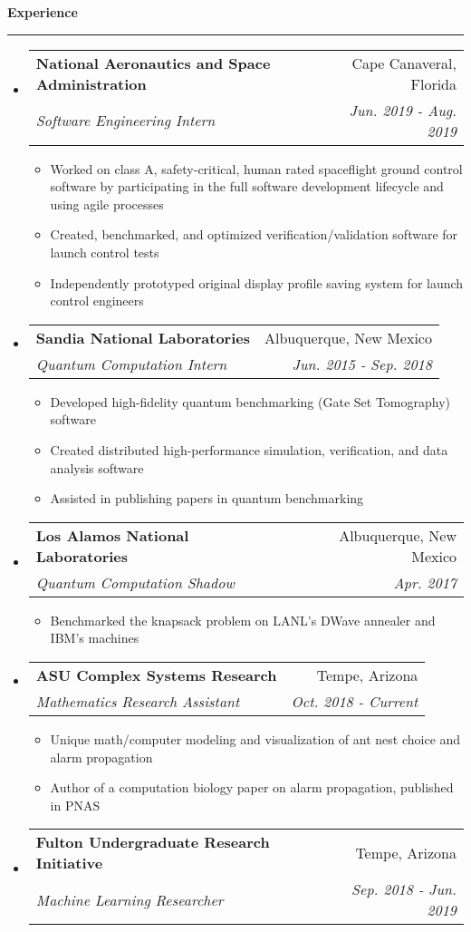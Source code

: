 \documentclass[letterpaper,11pt]{article}
\makeatletter
\newcommand{\sectionline}{
    \noindent\rule[0.5ex]{\linewidth}{0.5pt}
}
\newcommand{\resitem}[1]{\item #1 \vspace{-3pt}}
\newcommand{\resheading}[1]{
    {\large \textbf{#1}}
    \sectionline
}
\newcommand{\colfill}{@{\extracolsep{\fill}}}
\newcommand{\ressubheading}[4]{
\begin{tabular*}{6.5in}{l\colfill r}
		\textbf{#1} & #2 \\
		\textit{#3} & \textit{#4} \\
\end{tabular*}\vspace{-6pt}}
\makeatother
\begin{document}
\resheading{Experience}
\begin{itemize}
 \item
     \ressubheading{National Aeronautics and Space Administration}{Cape Canaveral, Florida}{Software Engineering Intern}{Jun. 2019 - Aug. 2019}
 	\begin{itemize}
 		\resitem{Worked on class A, safety-critical, human rated spaceflight ground control software by participating in the full software development lifecycle and using agile processes}
        \resitem{Created, benchmarked, and optimized verification/validation software for launch control tests}
 		\resitem{Independently prototyped original display profile saving system for launch control engineers}
 	\end{itemize}
 \item
    \ressubheading{Sandia National Laboratories}{Albuquerque, New Mexico}{Quantum Computation Intern}{Jun. 2015 - Sep. 2018}
 	\begin{itemize}
        \resitem{Developed high-fidelity quantum benchmarking (Gate Set Tomography) software}
 		\resitem{Created distributed high-performance simulation, verification, and data analysis software}
 		\resitem{Assisted in publishing papers in quantum benchmarking}
 	\end{itemize}
 \item
     \ressubheading{Los Alamos National Laboratories}{Albuquerque, New Mexico}{Quantum Computation Shadow}{Apr. 2017}
 	\begin{itemize}
 		\resitem{Benchmarked the knapsack problem on LANL's DWave annealer and IBM's machines}
 	\end{itemize}
 \item
    \ressubheading{ASU Complex Systems Research}{Tempe, Arizona}{Mathematics Research Assistant}{Oct. 2018 - Current}
 	\begin{itemize}
 		\resitem{Unique math/computer modeling and visualization of ant nest choice and alarm propagation}
        \resitem{Author of a computation biology paper on alarm propagation, published in PNAS}
 	\end{itemize}
 \item
     \ressubheading{Fulton Undergraduate Research Initiative}{Tempe, Arizona}{Machine Learning Researcher}{Sep. 2018 - Jun. 2019}
 	\begin{itemize}

\end{itemize}
\end{itemize}
\end{document}

